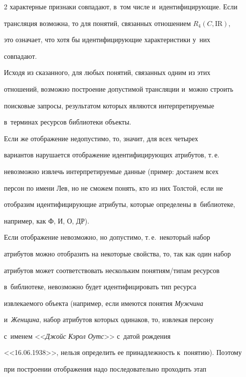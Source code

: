 \begin{multicols}{2}
характерные признаки совпадают, в~том числе и~идентифицирующие. Если 

трансляция возможна, то для понятий, связанных отношением $R_4(C, \mathrm{IR})$, 

это означает, что хотя бы идентифицирующие характеристики у~них 

совпадают.

    

    Исходя из сказанного, для любых понятий, связанных одним из этих 

отношений, возможно построение допустимой трансляции и~можно строить 

поисковые запросы, результатом которых являются интерпретируемые 

в~терминах ресурсов библиотеки объекты.





    

    Если же отображение недопустимо, то, значит, для всех четырех 

вариантов нарушается отображение идентифицирующих атрибутов, т.\,е.\ 

невозможно извлечь интерпретируемые данные (пример: достанем всех 

персон по имени Лев, но не сможем понять, кто из них Толстой, если не 

отобразим идентифицирующие атрибуты, которые определены в~библиотеке, 

например, как Ф, И, О, ДР). 

    

    Если отображение невозможно, но допустимо, т.\,е.\ некоторый набор 

атрибутов можно отобразить на некоторые свойства, то, так как один набор 

атрибутов может соответствовать нескольким по\-ня\-ти\-ям/ти\-пам ресурсов 

в~библиотеке, невозможно будет идентифицировать тип ресурса 

извлекаемого объекта (например, если имеются понятия \textit{Мужчина} 

и~\textit{Женщина}, набор атрибутов которых одинаков, то, извлекая персону 

с~именем <<\textit{Джойс Кэрол Оутс}>> с~датой рождения 

<<16.06.1938>>, нельзя определить ее принадлежность к~понятию). Поэтому 

при построении отображения надо последовательно проходить этап 


\end{multicols}
